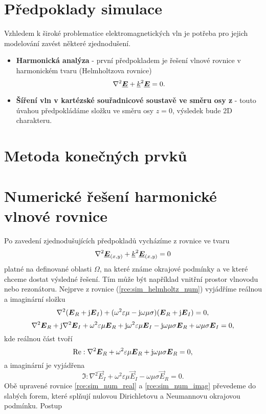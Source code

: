 \section{Předpoklady simulace}
Vzhledem k široké problematice elektromagnetických vln je potřeba pro jejich modelování zavést některé zjednodušení. 
\begin{itemize}
\item {\bf Harmonická analýza} - první předpokladem je řešení vlnové rovnice v harmonickém tvaru (Helmholtzova rovnice)
\begin{displaymath}
	\nabla^{2}\mbox{\underline{\boldmath$E$}} +{\underline{k}}^{2}\mbox{\underline{\boldmath$E$}} = 0.
\end{displaymath}
\item {\bf Šíření vln v kartézské souřadnicové soustavě ve směru osy z} - touto úvahou předpokládáme složku ve směru osy $z = 0$, výsledek bude 2D charakteru.
\end{itemize}
\newpage

\section{Metoda konečných prvků}

\section{Numerické řešení harmonické vlnové rovnice}
Po zavedení zjednodušujících předpokladů vycházíme z rovnice ve tvaru
\begin{equation}
	\nabla^{2}\mbox{\underline{\boldmath$E$}}_{(x,y)} +{\underline{k}}^{2}\mbox{\underline{\boldmath$E$}}_{(x,y)} = 0
	\label{rce:sim_helmholtz_num} 
\end{equation}
platné na definované oblasti $\Omega$, na které známe okrajové podmínky a ve které chceme dostat výsledné řešení. Tím může být například vnitřní prostor vlnovodu nebo rezonátoru. Nejprve z rovnice (\ref{rce:sim_helmholtz_num}) vyjádříme reálnou a imaginární složku
\begin{displaymath}
	\nabla^{2}(\mbox{\boldmath$E$}_R + \mathrm{j}\mbox{\boldmath$E$}_I) + (\omega^{2}\varepsilon\mu - \mathrm{j}\omega\mu\sigma)(\mbox{\boldmath$E$}_R + \mathrm{j}\mbox{\boldmath$E$}_I) = 0,
\end{displaymath}
\begin{displaymath}
	\nabla^{2}\mbox{\boldmath$E$}_R + \mathrm{j}\nabla^{2}\mbox{\boldmath$E$}_I + \omega^{2}\varepsilon\mu\mbox{\boldmath$E$}_R + \mathrm{j}\omega^{2}\varepsilon\mu\mbox{\boldmath$E$}_I - \mathrm{j}\omega\mu\sigma\mbox{\boldmath$E$}_R + \omega\mu\sigma\mbox{\boldmath$E$}_I = 0,
\end{displaymath}
kde reálnou část tvoří
\begin{equation}
	\mathrm{Re} : \nabla^{2}\mbox{\boldmath$E$}_R + \omega^{2}\varepsilon\mu\mbox{\boldmath$E$}_R + \mathrm{j}\omega\mu\sigma\mbox{\boldmath$E$}_R = 0,
	\label{rce:sim_num_real} 
\end{equation}
a imaginární je vyjádřena
\begin{equation}
	\Im : \nabla^{2}\vec E_I + \omega^{2}\varepsilon\mu\vec E_I - \omega\mu\sigma\vec E_R = 0.
	\label{rce:sim_num_imag} 
\end{equation}
Obě upravené rovnice \ref{rce:sim_num_real} a \ref{rce:sim_num_imag} převedeme do slabých forem, které splňují nulovou Dirichletovu a Neumannovu okrajovou podmínku. Postup 


